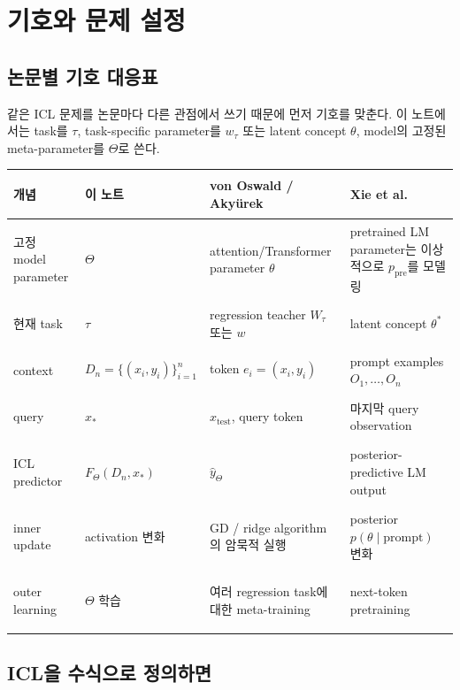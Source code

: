 \documentclass[11pt,a4paper,oneside,openany]{memoir}
\theoremstyle{definition}
\begin{document}
\tableofcontents*
\clearpage

\chapter{기호와 문제 설정}

\section{논문별 기호 대응표}

같은 ICL 문제를 논문마다 다른 관점에서 쓰기 때문에 먼저 기호를 맞춘다.
이 노트에서는 task를 $\tau$, task-specific parameter를 $w_\tau$ 또는 latent concept $\theta$, model의 고정된 meta-parameter를 $\Theta$로 쓴다.

\begin{center}
\small
\begin{tabularx}{\textwidth}{>{\bfseries\raggedright\arraybackslash}p{}Y Y Y}
\toprule
개념 & 이 노트 & von Oswald / Akyürek & Xie et al. \\
\midrule
고정 model parameter & $\Theta$ & attention/Transformer parameter $\theta$ & pretrained LM parameter는 이상적으로 $p_{\mathrm{pre}}$를 모델링 \\
현재 task & $\tau$ & regression teacher $W_\tau$ 또는 $w$ & latent concept $\theta^*$ \\
context & $D_n=\{(x_i,y_i)\}_{i=1}^n$ & token $e_i=(x_i,y_i)$ & prompt examples $O_1,\ldots,O_n$ \\
query & $x_*$ & $x_{\mathrm{test}}$, query token & 마지막 query observation \\
ICL predictor & $F_\Theta(D_n,x_*)$ & $\hat y_\Theta$ & posterior-predictive LM output \\
inner update & activation 변화 & GD / ridge algorithm의 암묵적 실행 & posterior $p(\theta\mid\text{prompt})$ 변화 \\
outer learning & $\Theta$ 학습 & 여러 regression task에 대한 meta-training & next-token pretraining \\
\bottomrule
\end{tabularx}
\end{center}

\section{ICL을 수식으로 정의하면}
\end{document}
